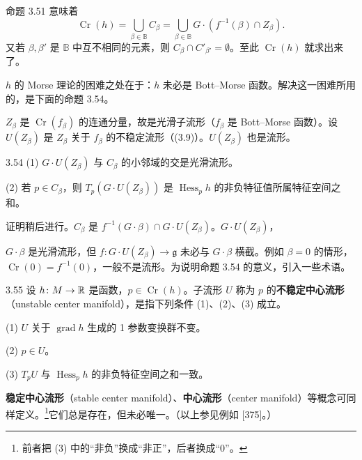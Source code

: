 命题 3.51 意味着
\[
  \operatorname{Cr}(h)=\bigcup_{\beta\in\mathbb{B}}C_\beta
  =\bigcup_{\beta\in\mathbb{B}}G\cdot(f^{-1}(\beta)\cap Z_\beta).
\]
又若 $\beta,\beta'$ 是 $\mathbb{B}$ 中互不相同的元素，则 $C_\beta\cap C'_{\beta'}=\emptyset$。至此 $\operatorname{Cr}(h)$ 就求出来了。


$h$ 的 Morse 理论的困难之处在于：$h$ 未必是 Bott–Morse 函数。解决这一困难所用的，是下面的命题 3.54。

$Z_\beta$ 是 $\operatorname{Cr}(f_\beta)$ 的连通分量，故是光滑子流形（$f_\beta$ 是 Bott–Morse 函数）。设 $U(Z_\beta)$ 是 $Z_\beta$ 关于 $f_\beta$ 的不稳定流形（(3.9)）。$U(Z_\beta)$ 也是流形。

\begin{proposition}{3.54}
  (1) $G\cdot U(Z_\beta)$ 与 $C_\beta$ 的小邻域的交是光滑流形。

  (2) 若 $p\in C_\beta$，则 $T_p(G\cdot U(Z_\beta))$ 是 $\operatorname{Hess}_ph$ 的非负特征值所属特征空间之和。
\end{proposition}

证明稍后进行。$C_\beta$ 是 $f^{-1}(G\cdot\beta)\cap G\cdot U(Z_\beta)$。$G\cdot U(Z_\beta)$，

$G\cdot\beta$ 是光滑流形，但 $f\colon G\cdot U(Z_\beta)\to\mathfrak{g}$ 未必与 $G\cdot\beta$ 横截。例如 $\beta=0$ 的情形，$\operatorname{Cr}(0)=f^{-1}(0)$，一般不是流形。为说明命题 3.54 的意义，引入一些术语。

\begin{definition}{3.55}
  设 $h\colon M\to\mathbb{R}$ 是函数，$p\in\operatorname{Cr}(h)$。子流形 $U$ 称为 $p$ 的\textbf{不稳定中心流形}（unstable center manifold），是指下列条件 (1)、(2)、(3) 成立。

  (1) $U$ 关于 $\operatorname{grad}h$ 生成的 1 参数变换群不变。

  (2) $p\in U$。

  (3) $T_pU$ 与 $\operatorname{Hess}_ph$ 的非负特征空间之和一致。
\end{definition}

\textbf{稳定中心流形}（stable center manifold）、\textbf{中心流形}（center manifold）等概念可同样定义。\footnote{前者把 (3) 中的“非负”换成“非正”，后者换成“0”。}它们总是存在，但未必唯一。（以上参见例如 [375]。）

